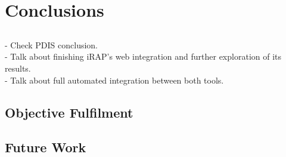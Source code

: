 \chapter{Conclusions} \label{chap:conclusions}

\section*{}

\begin{Notes}
- Check PDIS conclusion.\\
- Talk about finishing iRAP's web integration and further exploration of its
results.\\
- Talk about full automated integration between both tools.\\
\end{Notes}

\section{Objective Fulfilment}

\section{Future Work}
